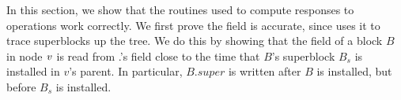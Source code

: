 In this section, we show that the routines used to compute responses to 
operations work correctly.
We first prove the  field is accurate, since  uses it to trace superblocks up the tree.  We do this by showing that the  field of a block $B$ in node $\mbox{\textnormal{\textit{v}}}$ is read from  
.'s  field close to the time that $B$'s superblock $B_s$ is installed in $v$'s parent.
In particular, $B.super$ is written after $B$ is installed, but before $B_s$ is installed.

